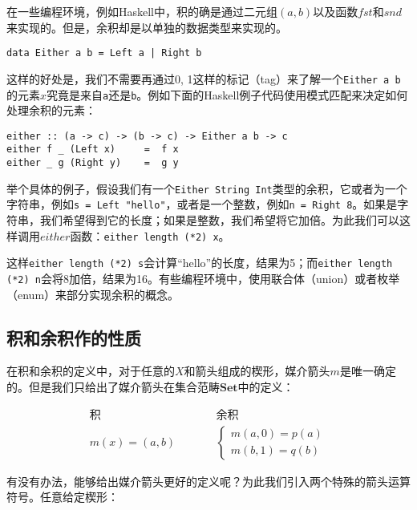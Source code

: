 \documentclass{article}
\begin{document}
在一些编程环境，例如Haskell中，积的确是通过二元组$(a, b)$以及函数$fst$和$snd$来实现的。但是，余积却是以单独的数据类型来实现的。

\begin{lstlisting}
data Either a b = Left a | Right b
\end{lstlisting}

这样的好处是，我们不需要再通过0, 1这样的标记（tag）来了解一个\texttt{Either a b}的元素$x$究竟是来自\texttt{a}还是\texttt{b}。例如下面的Haskell例子代码使用模式匹配来决定如何处理余积的元素：

\begin{lstlisting}
either :: (a -> c) -> (b -> c) -> Either a b -> c
either f _ (Left x)     =  f x
either _ g (Right y)    =  g y
\end{lstlisting}

举个具体的例子，假设我们有一个\texttt{Either String Int}类型的余积，它或者为一个字符串，例如\texttt{s = Left "hello"}，或者是一个整数，例如\texttt{n = Right 8}。如果是字符串，我们希望得到它的长度；如果是整数，我们希望将它加倍。为此我们可以这样调用$either$函数：\texttt{either length (*2) x}。

这样\texttt{either length (*2) s}会计算“hello”的长度，结果为5；而\texttt{either length (*2) n}会将8加倍，结果为16。有些编程环境中，使用联合体（union）或者枚举（enum）来部分实现余积的概念。

\subsection{积和余积作的性质}

在积和余积的定义中，对于任意的$X$和箭头组成的楔形，媒介箭头$m$是唯一确定的。但是我们只给出了媒介箭头在集合范畴$\pmb{Set}$中的定义：

\[
\begin{array}{ccc}
\text{积} & & \text{余积} \\
m(x) = (a, b) & \quad \quad &
\begin{cases}
m (a, 0) = p(a) \\
m (b, 1) = q(b)
\end{cases}
\end{array}
\]

有没有办法，能够给出媒介箭头更好的定义呢？为此我们引入两个特殊的箭头运算符号。任意给定楔形：

\begin{center}
\end{center}
\end{document}
